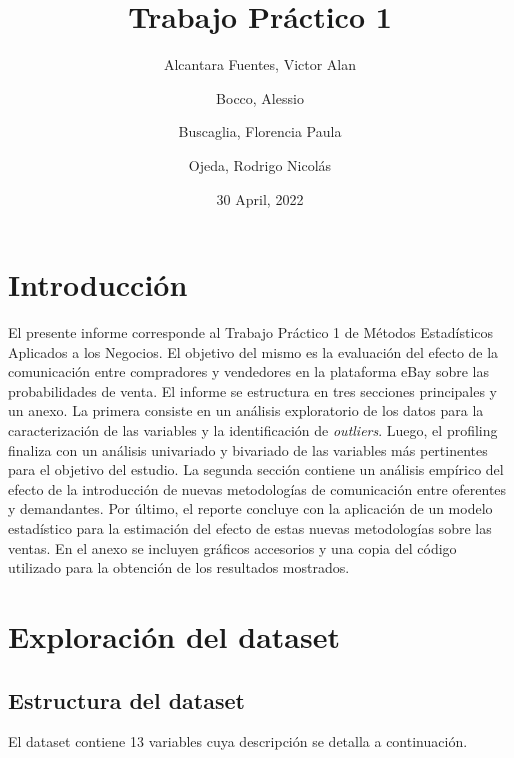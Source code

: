 \documentclass[
  12pt]{article}
\title{Trabajo Práctico 1}
\author{Alcantara Fuentes, Victor Alan \and Bocco, Alessio \and Buscaglia, Florencia Paula \and Ojeda, Rodrigo Nicolás}
\date{30 April, 2022}
\begin{document}
\maketitle

{
\setcounter{tocdepth}{2}
\tableofcontents
}
\hypertarget{introducciuxf3n}{%
\section{Introducción}\label{introducciuxf3n}}

El presente informe corresponde al Trabajo Práctico 1 de Métodos Estadísticos
Aplicados a los Negocios. El objetivo del mismo es la evaluación del efecto
de la comunicación entre compradores y vendedores en la plataforma eBay sobre
las probabilidades de venta.
El informe se estructura en tres secciones principales y un anexo. La primera consiste en un análisis exploratorio de los datos para la caracterización de las variables y la identificación de \emph{outliers}. Luego, el profiling finaliza con un análisis univariado y bivariado de las variables más pertinentes para el objetivo del estudio. La segunda sección contiene un análisis empírico del efecto de la introducción de nuevas metodologías de comunicación entre oferentes y demandantes. Por último, el reporte concluye con la aplicación de un modelo estadístico para la estimación del efecto de estas nuevas metodologías sobre las ventas. En el anexo se incluyen gráficos accesorios y una copia del código utilizado para la obtención de los resultados mostrados.

\hypertarget{exploraciuxf3n-del-dataset}{%
\section{Exploración del dataset}\label{exploraciuxf3n-del-dataset}}

\hypertarget{estructura-del-dataset}{%
\subsection{Estructura del dataset}\label{estructura-del-dataset}}

El dataset contiene 13 variables cuya descripción se detalla a continuación.
\end{document}
